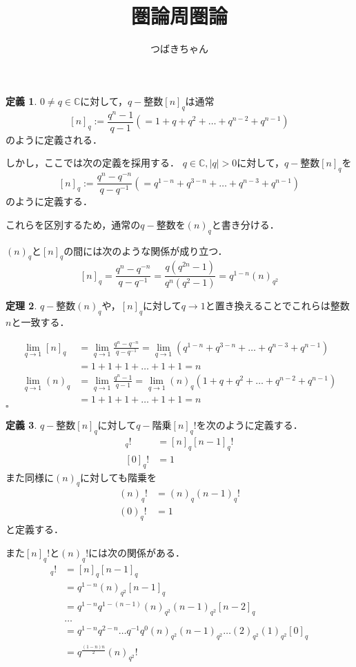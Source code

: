 \documentclass{article}
\title{圏論周圏論}
\author{つばきちゃん}
\makeatletter
\theoremstyle{definition}
\newtheorem{theorem}{定理}[section]
\newtheorem{definition}[theorem]{定義}
\renewenvironment{proof}[1][(証明)]{\par
  \normalfont
  \topsep6\p@\@plus6\p@ \trivlist
  \item[\hskip\labelsep{#1}]\ignorespaces
}{\hfill$\square$\endtrivlist}	%
\numberwithin{equation}{section}
\newcommand{\CC}{\mathbb{C}}
\newcommand{\1}{\mathbb{1}}
\newcommand{\2}{\mathbb{2}}
\renewcommand{\.}{\hspace{2mm}}
\makeatother
\begin{document}
\maketitle
\newpage

\tableofcontents
\clearpage
\begin{definition}
  $0\neq q\in\CC$に対して，$q-$整数$[n]_q$は通常
  \[
    [n]_q:=\frac{q^n-1}{q-1}(=1+q+q^2+\dots+q^{n-2}+q^{n-1})
  \]
  のように定義される．

  しかし，ここでは次の定義を採用する．
  $q\in\CC,|q|>0$に対して，$q-$整数$[n]_q$を
  \[
    [n]_q:=\frac{q^n-q^{-n}}{q-q^{-1}}(=q^{1-n}+q^{3-n}+\dots+q^{n-3}+q^{n-1})
  \]
  のように定義する．

  これらを区別するため，通常の$q-$整数を$(n)_q$と書き分ける．
\end{definition}
$(n)_q$と$[n]_q$の間には次のような関係が成り立つ．
\[
  [n]_q=\frac{q^n-q^{-n}}{q-q^{-1}}=\frac{q(q^{2n}-1)}{q^n(q^2-1)}=q^{1-n}(n)_{q^2}
\]
\begin{theorem}
  $q-$整数$(n)_q$や，$[n]_q$に対して$q\to1$と置き換えることでこれらは整数$n$と一致する．
\end{theorem}
\begin{proof}
  \begin{align*}
    \lim_{q\to1}[n]_q&=\lim_{q\to1}\frac{q^n-q^{-n}}{q-q^{-1}}=\lim_{q\to1}(q^{1-n}+q^{3-n}+\dots+q^{n-3}+q^{n-1}) \\
    &=1+1+1+\dots+1+1=n\\
    \lim_{q\to1}(n)_q&=\lim_{q\to1}\frac{q^n-1}{q-1}=\lim_{q\to1}(n)_q(1+q+q^2+\dots+q^{n-2}+q^{n-1})\\
    &=1+1+1+\dots+1+1=n
  \end{align*}
\end{proof}
\begin{definition}
  $q-$整数$[n]_q$に対して$q-$階乗$[n]_q!$を次のように定義する．
  \begin{align*}
    [n]_q!&= [n]_q[n-1]_q!\\
    [0]_q!&= 1
  \end{align*}
  また同様に$(n)_q$に対しても階乗を
  \begin{align*}
    (n)_q!&= (n)_q(n-1)_q!\\
    (0)_q!&= 1
  \end{align*}
  と定義する．
\end{definition}
また$[n]_q!$と$(n)_q!$には次の関係がある．
\begin{align}
  [n]_q!&=[n]_q[n-1]_q \nonumber \\
  &=q^{1-n}(n)_{q^2}[n-1]_q \nonumber \\
  &=q^{1-n}q^{1-(n-1)}(n)_{q^2}(n-1)_{q^2}[n-2]_q \nonumber \\
  &\dots \nonumber \\
  &=q^{1-n}q^{2-n}\dots q^{-1}q^0(n)_{q^2}(n-1)_{q^2}\dots(2)_{q^2}(1)_{q^2}[0]_q \nonumber \\
  &=q^{\frac{(1-n)n}{2}}(n)_{q^2}! \label{eq:0.1}
\end{align}
\end{document}
